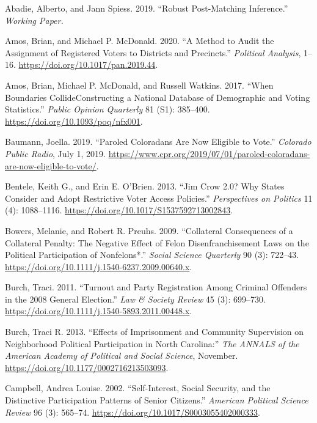\documentclass[
  12pt,
]{article}
\newlength{\cslhangindent}
\newenvironment{cslreferences}%
  {\setlength{\parindent}{0pt}%
  \everypar{\setlength{\hangindent}{\cslhangindent}}\ignorespaces}%
  {\par}
\begin{document}
\hypertarget{refs}{}
\begin{cslreferences}
\leavevmode\hypertarget{ref-Abadie2019}{}%
Abadie, Alberto, and Jann Spiess. 2019. ``Robust Post-Matching Inference.'' \emph{Working Paper.}

\leavevmode\hypertarget{ref-Amos2020}{}%
Amos, Brian, and Michael P. McDonald. 2020. ``A Method to Audit the Assignment of Registered Voters to Districts and Precincts.'' \emph{Political Analysis}, 1--16. \url{https://doi.org/10.1017/pan.2019.44}.

\leavevmode\hypertarget{ref-Amos2017}{}%
Amos, Brian, Michael P. McDonald, and Russell Watkins. 2017. ``When Boundaries CollideConstructing a National Database of Demographic and Voting Statistics.'' \emph{Public Opinion Quarterly} 81 (S1): 385--400. \url{https://doi.org/10.1093/poq/nfx001}.

\leavevmode\hypertarget{ref-Baumann2019}{}%
Baumann, Joella. 2019. ``Paroled Coloradans Are Now Eligible to Vote.'' \emph{Colorado Public Radio}, July 1, 2019. \url{https://www.cpr.org/2019/07/01/paroled-coloradans-are-now-eligible-to-vote/}.

\leavevmode\hypertarget{ref-Bentele2013}{}%
Bentele, Keith G., and Erin E. O'Brien. 2013. ``Jim Crow 2.0? Why States Consider and Adopt Restrictive Voter Access Policies.'' \emph{Perspectives on Politics} 11 (4): 1088--1116. \url{https://doi.org/10.1017/S1537592713002843}.

\leavevmode\hypertarget{ref-Bowers2009}{}%
Bowers, Melanie, and Robert R. Preuhs. 2009. ``Collateral Consequences of a Collateral Penalty: The Negative Effect of Felon Disenfranchisement Laws on the Political Participation of Nonfelons*.'' \emph{Social Science Quarterly} 90 (3): 722--43. \url{https://doi.org/10.1111/j.1540-6237.2009.00640.x}.

\leavevmode\hypertarget{ref-Burch2011}{}%
Burch, Traci. 2011. ``Turnout and Party Registration Among Criminal Offenders in the 2008 General Election.'' \emph{Law \& Society Review} 45 (3): 699--730. \url{https://doi.org/10.1111/j.1540-5893.2011.00448.x}.

\leavevmode\hypertarget{ref-Burch2013}{}%
Burch, Traci R. 2013. ``Effects of Imprisonment and Community Supervision on Neighborhood Political Participation in North Carolina:'' \emph{The ANNALS of the American Academy of Political and Social Science}, November. \url{https://doi.org/10.1177/0002716213503093}.

\leavevmode\hypertarget{ref-Campbell2002}{}%
Campbell, Andrea Louise. 2002. ``Self-Interest, Social Security, and the Distinctive Participation Patterns of Senior Citizens.'' \emph{American Political Science Review} 96 (3): 565--74. \url{https://doi.org/10.1017/S0003055402000333}.


\end{cslreferences}
\end{document}
